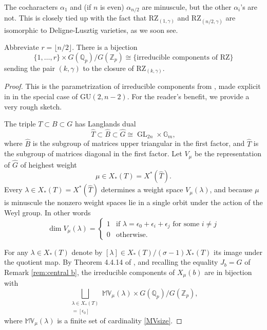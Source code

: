 \documentclass[11pt]{alggeom}
\newcommand{\iso}{\cong}
\newcommand{\Q}{\mathbb Q}
\newcommand{\Z}{\mathbb Z}
\DeclareMathOperator{\GL}{GL}
\begin{document}
\begin{remark}
The cocharacters $\alpha_1$ and (if $n$ is even) $\alpha_{n/2}$ are minuscule, but the other $\alpha_i$'s are not.  This is closely tied up with the fact that $\mathrm{RZ}_{(1,\gamma)}$ and 
$\mathrm{RZ}_{(n/2,\gamma)}$ are isomorphic to  Deligne-Lusztig varieties, as we soon see.
\end{remark}


\begin{theorem}\label{thm:XZexplicit}
Abbreviate $r=\lfloor n/2 \rfloor$.
There is a bijection 
\[
\{ 1,\ldots,  r \} \times G(\Q_p)/G(\Z_p) \iso
\{ \mbox{irreducible components of } \mathrm{RZ} \}
\]
 sending  the pair $(k,\gamma)$ to the closure of  $\mathrm{RZ}_{(k,\gamma)}$.
  \end{theorem}


\begin{proof}
This is the parametrization of irreducible components from \cite{XZ}, made explicit in \cite{FI} in the special case of $\mathrm{GU}(2,n-2)$.  For the reader's benefit, we provide a very rough sketch.


The triple $T\subset B\subset G$ has  Langlands dual 
\[
\widehat{T} \subset \widehat{B} \subset \widehat{G} \iso \GL_{2n} \times \mathbb{G}_m,
\]
where $\widehat{B}$ is the subgroup of matrices upper triangular in the first factor, and $\widehat{T}$ is the subgroup of matrices diagonal in the first factor.
Let $V_\mu$ be the representation of $\widehat{G}$ of heighest weight 
\[
\mu  \in X_*(T)=X^*(\widehat{T}). 
\]
Every $\lambda \in X_*(T)=X^*(\widehat{T})$ determines a weight space $V_\mu(\lambda)$, 
and because $\mu$ is minuscule the nonzero weight spaces lie in a single orbit under the action of the Weyl group.  In other words
\begin{equation}\label{MVsize}
\dim V_\mu(\lambda)
= \begin{cases}
1 & \mbox{if }  \lambda= \epsilon_0+\epsilon_i+\epsilon_j \mbox{ for some } i\neq j\\
0 & \mbox{otherwise.}
\end{cases}
\end{equation}



For any $\lambda \in X_*(T)$ denote by $[\lambda] \in X_*(T)/ (\sigma-1) X_*(T)$ its image under the quotient map.
By  Theorem 4.4.14 of \cite{XZ}, and recalling the equality $J_b=G$ of Remark \ref{rem:central b},
the irreducible components of $X_\mu(b)$ are in bijection with 
\begin{equation}\label{XZparameters}
\bigsqcup_{ \substack{ \lambda\in X_*(T) \\  [ \lambda] =[   \epsilon_0 ]  }}\mathbb{MV}_\mu(\lambda) \times 
G(\Q_p)/G(\Z_p) ,
\end{equation}
where $\mathbb{MV}_\mu(\lambda)$ is a finite set of cardinality  \eqref{MVsize}.



\end{proof}
\end{document}
